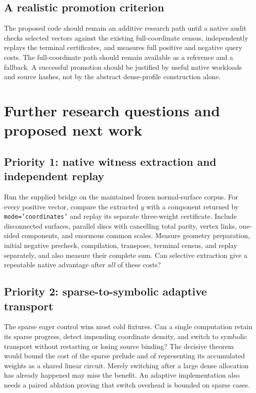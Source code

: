 \documentclass[11pt]{article}
\theoremstyle{definition}\newtheorem{definition}[theorem]{Definition}
\theoremstyle{remark}\newtheorem{remark}[theorem]{Remark}
\begin{document}
\subsection{A realistic promotion criterion}
The proposed code should remain an additive research path until a native audit
checks selected vectors against the existing full-coordinate census, independently
replays the terminal certificates, and measures full positive and negative query
costs. The full-coordinate path should remain available as a reference and a
fallback. A successful promotion should be justified by useful native workloads
and source hashes, not by the abstract dense-profile construction alone.

\section{Further research questions and proposed next work}
\label{sec:questions}

\subsection{Priority 1: native witness extraction and independent replay}
Run the supplied bridge on the maintained frozen normal-surface corpus. For every
positive vector, compare the extracted $y$ with a component returned by
\texttt{mode='coordinates'} and replay its separate three-weight certificate.
Include disconnected surfaces, parallel discs with cancelling total parity,
vertex links, one-sided components, and enormous common scales. Measure geometry
preparation, initial negative precheck, compilation, transpose, terminal census,
and replay separately, and also measure their complete sum. Can selective
extraction give a repeatable native advantage after \emph{all} of these costs?

\subsection{Priority 2: sparse-to-symbolic adaptive transport}
The sparse eager control wins most cold fixtures. Can a single computation retain
its sparse progress, detect impending coordinate density, and switch to symbolic
transport without restarting or losing source binding? The decisive theorem would
bound the cost of the sparse prelude and of representing its accumulated weights
as a shared linear circuit. Merely switching after a large dense allocation has
already happened may miss the benefit. An adaptive implementation also needs a
paired ablation proving that switch overhead is bounded on sparse cases.
\end{document}
